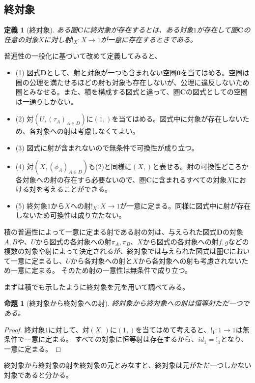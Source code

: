 \documentclass[dvipdfmx]{jsarticle}
\newcommand{\cat}[1]{\boldsymbol{#1}}
\newcommand{\arrow}{\rightarrow}
\newcommand{\mor}[3]{#1:#2\arrow #3}
\newtheorem{proof}{証明}[section]
\newtheorem{prop}{命題}[section]
\newtheorem{define}{定義}[section]
\begin{document}
	\subsection{終対象}
	\begin{define}[終対象]
		ある圏$\cat{C}$に終対象が存在するとは、ある対象$1$が存在して圏$\cat{C}$の任意の対象$X$に対し射$\mor{!_X}{X}{1}$が一意に存在するときである。
	\end{define}
	普遍性の一般化に基づいて改めて定義してみると、
	\begin{itemize}
		\item (1)
		図式$\cat{D}$として、射と対象が一つも含まれない空圏$\cat{0}$を当てはめる。空圏は圏の公理を満たせるほどの射も対象も存在しないが、公理に違反しないため圏とみなせる。また、積を構成する図式と違って、圏$\cat{C}$の図式としての空圏は一通りしかない。
		\item (2)
		対$(U,(\tau_A)_{A\in D})$に$(1,{})$を当てはめる。図式中に対象が存在しないため、各対象への射は考慮しなくてよい。
		\item (3)
		図式に射が含まれないので無条件で可換性が成り立つ。
		\item (4)
		対$(X,(\phi_A)_{A\in D})$も(2)と同様に$(X,{})$と表せる。射の可換性どころか各対象への射の存在すら必要ないので、圏$\cat{C}$に含まれるすべての対象$X$における対を考えることができる。
		\item (5)
		終対象$1$から$X$への射$\mor{!_X}{X}{1}$が一意に定まる。同様に図式中に射が存在しないため可換性は成り立たない。
	\end{itemize}
	積の普遍性によって一意に定まる射である射の対は、与えられた図式$\cat{D}$の対象$A,B$や、$U$から図式の各対象への射$\pi_A,\pi_B$、$X$から図式の各対象への射$f,g$などの複数の対象や射によって決定されるが、終対象では与えられた図式は圏$\cat{C}$において一意に定まるし、$U$から各対象への射と$X$から各対象への射も考慮されないため一意に定まる。
	そのため射の一意性は無条件で成り立つ。

	まずは積でも示したように終対象を元を用いて調べてみる。
	\begin{prop}[終対象から終対象への射]
		終対象から終対象への射は恒等射ただ一つである。
	\end{prop}
	\begin{proof}
		終対象$1$に対して、対$(X,{})$に$(1,{})$を当てはめて考えると、$\mor{!_1}{1}{1}$は無条件で一意に定まる。
		すべての対象に恒等射は存在するから、$id_1=!_1$となり、一意に定まる。
	\end{proof}
	終対象から終対象の射を終対象の元とみなすと、終対象は元がただ一つしかない対象であると分かる。
\end{document}

